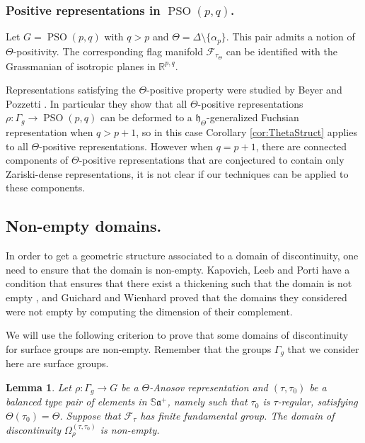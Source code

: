 \documentclass[reqno,10pt]{amsart}
\theoremstyle{plain}
\newtheorem{lem}[thm]{Lemma}
\theoremstyle{definition}
\theoremstyle{remark}
\newcommand{\type}{\tau}
\newcommand{\typeS}{{\tau_0}}
\newcommand{\R}{\mathbb{R}}
\newcommand{\Sph}{\mathbb{S}}
\DeclareMathOperator{\PSO}{PSO}
\newcommand{\ie}{namely }
\begin{document}
\subsubsection{Positive representations in \texorpdfstring{$\PSO(p,q)$}{PSO(p,q)}.}
\label{sec:PSO(p,q)}

Let $G=\PSO(p,q)$ with $q>p$ and $\Theta=\Delta\setminus \lbrace\alpha_p\rbrace$. This pair admits a notion of $\Theta$-positivity. The corresponding flag manifold $\mathcal{F}_{\tau_\Theta}$ can be identified with the Grassmanian of isotropic planes in $\R^{p,q}$. 

\medskip

Representations satisfying the $\Theta$-positive property were studied by Beyer and Pozzetti \cite{BeyerPozzetti}. In particular they show that all $\Theta$-positive representations $\rho:\Gamma_g\to \PSO(p,q)$ can be deformed to a $\mathfrak{h}_\Theta$-generalized Fuchsian representation when $q>p+1$, so in this case Corollary \ref{cor:ThetaStruct} applies to all $\Theta$-positive representations.
However when $q=p+1$, there are connected components of $\Theta$-positive representations that are conjectured to contain only Zariski-dense representations, it is not clear if our techniques can be applied to these components.

\subsection{Non-empty domains.}
\label{subsec:CheckNonEmpty}
In order to get a geometric structure associated to a domain of discontinuity, one need to ensure that the domain is non-empty. Kapovich, Leeb and Porti have a condition that ensures that there exist a thickening such that the domain is not empty \cite{KLP-DoD}, and Guichard and Wienhard proved that the domains they considered were not empty by computing the dimension of their complement. 

\medskip

We will use the following criterion to prove that some domains of discontinuity for surface groups are non-empty. Remember that the groups $\Gamma_g$ that we consider here are surface groups.

\begin{lem}
\label{lem:Non-emptyDomain}
Let $\rho:\Gamma_g\to G$ be a $\Theta$-Anosov representation and $(\type, \type_0)$ be a balanced type pair of elements in $\Sph\mathfrak{a}^+$, \ie such that $\typeS$ is $\type$-regular, satisfying $\Theta(\type_0)=\Theta$. Suppose that $\mathcal{F}_\type$ has finite fundamental group. The domain of discontinuity $\Omega_\rho^{(\type,\typeS)}$ is non-empty.
\end{lem}
\end{document}
